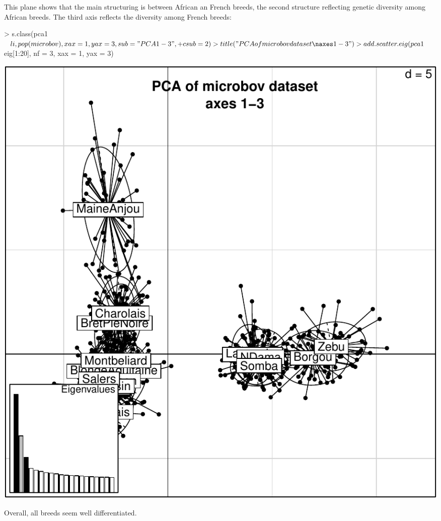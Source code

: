 \documentclass{article}
\begin{document}
\noindent This plane shows that the main structuring is between African an French breeds, the second structure reflecting genetic diversity among African breeds.
The third axis reflects the diversity among French breeds:
\begin{Schunk}
\begin{Sinput}
> s.class(pca1$li, pop(microbov), xax = 1, yax = 3, sub = "PCA 1-3", 
+     csub = 2)
> title("PCA of microbov dataset\naxes 1-3")
> add.scatter.eig(pca1$eig[1:20], nf = 3, xax = 1, yax = 3)
\end{Sinput}
\end{Schunk}
\includegraphics{figs/base-077}

\noindent Overall, all breeds seem well differentiated.
~\\
\end{document}
